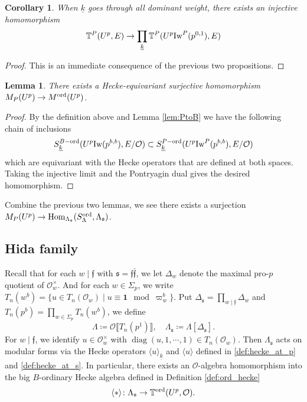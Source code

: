 \documentclass[leqno]{amsart}
\newtheorem{lem}[thm]{Lemma}
\newtheorem{cor}[thm]{Corollary}
\theoremstyle{definition}
\theoremstyle{remark}
\newcommand{\id}{\mathbf{1}}
\newcommand{\oo}{\mathcal{O}}
\DeclareMathOperator{\Hom}{Hom}
\DeclareMathOperator{\diag}{diag}
\newcommand{\ff}{\mathfrak{f}}
\newcommand{\fs}{\mathfrak{s}}
\newcommand{\wt}[1]{\underline{ #1 }}
\newcommand{\Iw}{\textnormal{Iw}} %
\newcommand{\TT}{\mathbb{T}} %
\newcommand{\ord}{\textnormal{ord}} %
\begin{document}
\begin{cor}\label{cor:density}
    When $\wt{k}$ goes through all dominant weight, 
    there exists an injective homomorphism
    \[
        \TT^P(U^p,E)\to \prod_{\wt{k}}\TT^P(U^p\Iw^P(p^{0,1}),E)
    \]
\end{cor}
\begin{proof}
This is an immediate consequence of the previous two propositions.
\end{proof}

\begin{lem}\label{lem:coh_to_ord}
	There exists a Hecke-equivariant
	surjective homomorphism 
	$M_P(U^p)\to M^{\ord}(U^p)$. 
\end{lem}
\begin{proof}
By the definition above and Lemma \ref{lem:PtoB}
we have the following chain of 
inclusions
\[
	S_{\wt{k}}^{B-\ord}(U^p\Iw(p^{b,b}),E/\oo)\subset
	S_{\wt{k}}^{P-\ord}(U^p\Iw^P(p^{b,b}),E/\oo)
\]
which are equivariant with the Hecke operators
that are defined at both spaces.
Taking the injective limit and the Pontryagin dual 
gives the desired homomorphism.
\end{proof}
Combine the previous two lemmas,
we see there exists a surjection
$M_P(U^p)\to \Hom_{\Lambda_{\fs}}(S^{\ord}_\Lambda,\Lambda_{\fs})$.


\subsection{Hida family}

Recall that for each $w\mid \ff$
with $\fs=\ff\bar{\ff}$,
we let $\Delta_w$ denote the maximal pro-$p$ quotient
of $\oo_w^\times$.
And for each $w\in \Sigma_p$,
we write $T_n(w^b)=\{u\in T_n(\oo_w)\mid u\equiv \id \mod\varpi_w^b\}$.
Put $\Delta_{\fs}=\prod_{w\mid \ff}\Delta_w$
and $T_n(p^b)=\prod_{w\in\Sigma_p}T_n(w^b)$,
we define 
\begin{equation}\label{def:lambda_rings}
    \Lambda\coloneqq \oo\llbracket T_n(p^1)\rrbracket,\quad
    \Lambda_{\fs}\coloneqq\Lambda[\Delta_{\fs}].
\end{equation}
For $w\mid \ff$,
we identify $u\in \oo_w^\times$
with $\diag(u,1,\cdots,1)\in T_n(\oo_w)$.
Then $\Lambda_{\fs}$ acts 
on modular forms via the Hecke operators
$\langle u\rangle_{\wt{k}}$ and $\langle u \rangle$
defined in \eqref{def:hecke_at_p} and \eqref{def:hecke_at_s}.
In particular, there exists an $\oo$-algebra homomorphism
into the big $B$-ordinary Hecke algebra
defined in Definition \ref{def:ord_hecke}
\begin{equation}\label{eq:Lambda_hecke}
    \langle *\rangle\colon \Lambda_{\fs}\to 
    \TT^{\ord}(U^p, \oo).
\end{equation}
\end{document}
